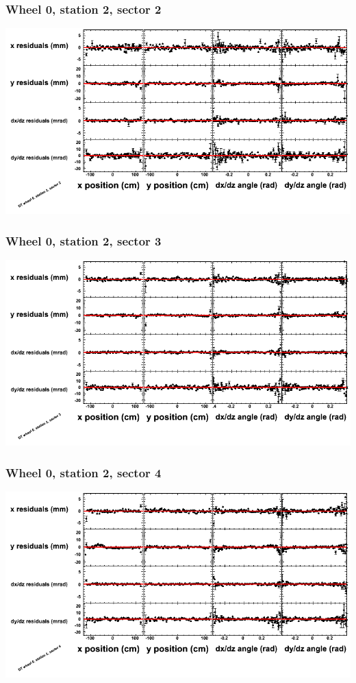 \documentclass[compress]{beamer}
\begin{document}
\begin{frame}
\frametitle{Wheel 0, station 2, sector 2}
\includegraphics[width=\linewidth]{tmppoly_MBwhCst2sec02.png}
\end{frame}

\begin{frame}
\frametitle{Wheel 0, station 2, sector 3}
\includegraphics[width=\linewidth]{tmppoly_MBwhCst2sec03.png}
\end{frame}

\begin{frame}
\frametitle{Wheel 0, station 2, sector 4}
\includegraphics[width=\linewidth]{tmppoly_MBwhCst2sec04.png}
\end{frame}
\end{document}
